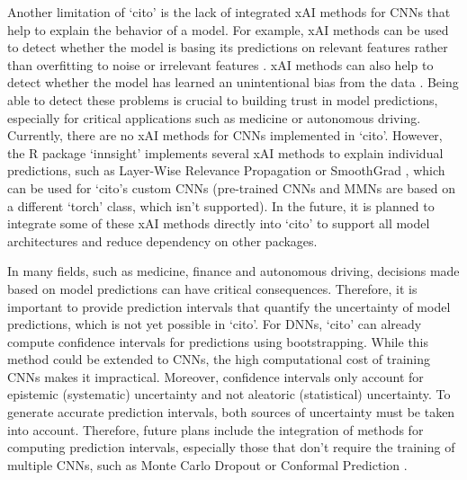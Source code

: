 \documentclass[12pt,twoside]{scrreport}
\newcommand{\pkg}[1]{`#1'}
\begin{document}
Another limitation of \pkg{cito} is the lack of integrated xAI methods for CNNs that help to explain the behavior of a model. For example, xAI methods can be used to detect whether the model is basing its predictions on relevant features rather than overfitting to noise or irrelevant features \citep[e.g., basing the classification of images of wolves or dogs on whether or not there is snow in the background ][]{ribeiroWhyShouldTrust2016}. xAI methods can also help to detect whether the model has learned an unintentional bias from the data \citep[e.g., gender bias in the classification of images of doctors or nurses ][]{selvarajuGradCAMVisualExplanations2020}. Being able to detect these problems is crucial to building trust in model predictions, especially for critical applications such as medicine or autonomous driving. Currently, there are no xAI methods for CNNs implemented in \pkg{cito}. However, the R package \pkg{innsight} \citep{koenenInterpretingDeepNeural2024} implements several xAI methods to explain individual predictions, such as Layer-Wise Relevance Propagation \citep{bachPixelWiseExplanationsNonLinear2015a} or SmoothGrad \citep{smilkovSmoothGradRemovingNoise2017}, which can be used for \pkg{cito}s custom CNNs (pre-trained CNNs and MMNs are based on a different \pkg{torch} class, which isn't supported). In the future, it is planned to integrate some of these xAI methods directly into \pkg{cito} to support all model architectures and reduce dependency on other packages.

In many fields, such as medicine, finance and autonomous driving, decisions made based on model predictions can have critical consequences. Therefore, it is important to provide prediction intervals that quantify the uncertainty of model predictions, which is not yet possible in \pkg{cito}. For DNNs, \pkg{cito} can already compute confidence intervals for predictions using bootstrapping. While this method could be extended to CNNs, the high computational cost of training CNNs makes it impractical. Moreover, confidence intervals only account for epistemic (systematic) uncertainty and not aleatoric (statistical) uncertainty. To generate accurate prediction intervals, both sources of uncertainty must be taken into account. Therefore, future plans include the integration of methods for computing prediction intervals, especially those that don't require the training of multiple CNNs, such as Monte Carlo Dropout \citep{galDropoutBayesianApproximation2016} or Conformal Prediction \citep{shafer2008tutorial}.
\end{document}
